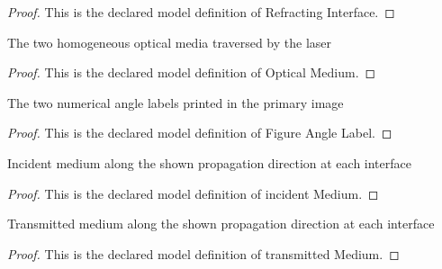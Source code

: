 \begin{proof}
  This is the declared model definition of Refracting Interface.
\end{proof}
\begin{definition}
  \label{def:physics:phyx-mini-0006:phyxminiproblems-problemphyxmini0006-opticalmedium}
  The two homogeneous optical media traversed by the laser
\end{definition}
\begin{proof}
  This is the declared model definition of Optical Medium.
\end{proof}
\begin{definition}
  \label{def:physics:phyx-mini-0006:phyxminiproblems-problemphyxmini0006-figureanglelabel}
  The two numerical angle labels printed in the primary image
\end{definition}
\begin{proof}
  This is the declared model definition of Figure Angle Label.
\end{proof}
\begin{definition}
  \label{def:physics:phyx-mini-0006:phyxminiproblems-problemphyxmini0006-incidentmedium}
  Incident medium along the shown propagation direction at each interface
\end{definition}
\begin{proof}
  This is the declared model definition of incident Medium.
\end{proof}
\begin{definition}
  \label{def:physics:phyx-mini-0006:phyxminiproblems-problemphyxmini0006-transmittedmedium}
  Transmitted medium along the shown propagation direction at each interface
\end{definition}
\begin{proof}
  This is the declared model definition of transmitted Medium.
\end{proof}
